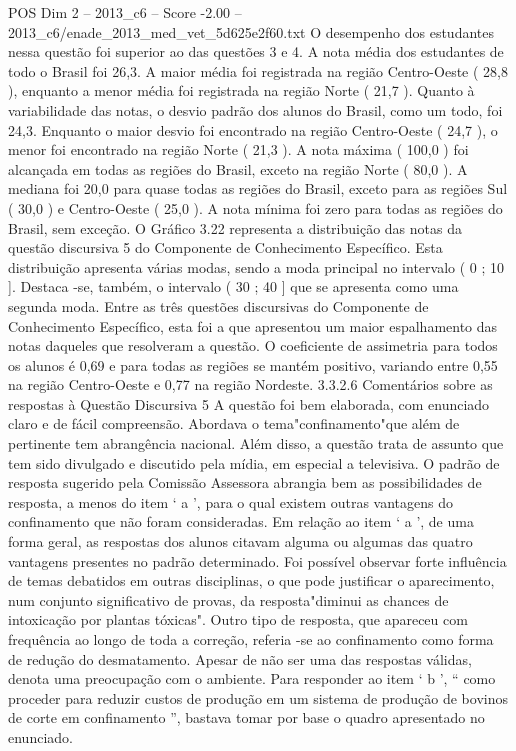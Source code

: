 \begin{textsample}{POS Dim 2 – 2013\_c6 – Score -2.00 – 2013\_c6/enade\_2013\_med\_vet\_5d625e2f60.txt}
O desempenho dos estudantes nessa questão foi superior ao das questões 3 e 4.
A nota média dos estudantes de todo o Brasil foi 26,3.
A maior média foi registrada na região Centro-Oeste ( 28,8 ), enquanto a menor média foi registrada na região Norte ( 21,7 ).
Quanto à variabilidade das notas, o desvio padrão dos alunos do Brasil, como um todo, foi 24,3.
Enquanto o maior desvio foi encontrado na região Centro-Oeste ( 24,7 ), o menor foi encontrado na região Norte ( 21,3 ).
A nota máxima ( 100,0 ) foi alcançada em todas as regiões do Brasil, exceto na região Norte ( 80,0 ).
A mediana foi 20,0 para quase todas as regiões do Brasil, exceto para as regiões Sul ( 30,0 ) e Centro-Oeste ( 25,0 ).
A nota mínima foi zero para todas as regiões do Brasil, sem exceção.
O Gráfico 3.22 representa a distribuição das notas da questão discursiva 5 do Componente de Conhecimento Específico.
Esta distribuição apresenta várias modas, sendo a moda principal no intervalo ( 0 ; 10 ].
Destaca -se, também, o intervalo ( 30 ; 40 ] que se apresenta como uma segunda moda.
Entre as três questões discursivas do Componente de Conhecimento Específico, esta foi a que apresentou um maior espalhamento das notas daqueles que resolveram a questão.
O coeficiente de assimetria para todos os alunos é 0,69 e para todas as regiões se mantém positivo, variando entre 0,55 na região Centro-Oeste e 0,77 na região Nordeste. 3.3.2.6 Comentários sobre as respostas à Questão Discursiva 5 A questão foi bem elaborada, com enunciado claro e de fácil compreensão.
Abordava o tema"confinamento"que além de pertinente tem abrangência nacional.
Além disso, a questão trata de assunto que tem sido divulgado e discutido pela mídia, em especial a televisiva.
O padrão de resposta sugerido pela Comissão Assessora abrangia bem as possibilidades de resposta, a menos do item ‘ a ’, para o qual existem outras vantagens do confinamento que não foram consideradas.
Em relação ao item ‘ a ’, de uma forma geral, as respostas dos alunos citavam alguma ou algumas das quatro vantagens presentes no padrão determinado.
Foi possível observar forte influência de temas debatidos em outras disciplinas, o que pode justificar o aparecimento, num conjunto significativo de provas, da resposta"diminui as chances de intoxicação por plantas tóxicas".
Outro tipo de resposta, que apareceu com frequência ao longo de toda a correção, referia -se ao confinamento como forma de redução do desmatamento.
Apesar de não ser uma das respostas válidas, denota uma preocupação com o ambiente.
Para responder ao item ‘ b ’, “ como proceder para reduzir custos de produção em um sistema de produção de bovinos de corte em confinamento ”, bastava tomar por base o quadro apresentado no enunciado.

\end{textsample}
